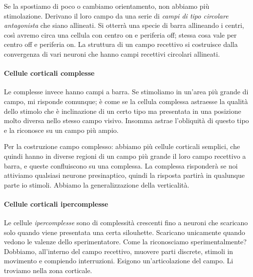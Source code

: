\documentclass[a4paper,12pt]{article}
\begin{document}
Se la spostiamo di poco o cambiamo orientamento, non abbiamo più stimolazione. Derivano il loro campo da una serie di \emph{campi di tipo circolare antagonista} che siano allineati. Si otterrà una specie di barra allineando i centri, così avremo circa una cellula con centro on e periferia off; stessa cosa vale per centro off e periferia on. La struttura di un campo recettivo si costruisce dalla convergenza di vari neuroni che hanno campi recettivi circolari allineati. 

\paragraph{Cellule corticali complesse}
Le complesse invece hanno campi a barra. Se stimoliamo in un'area più grande di campo, mi risponde comunque; è come se la cellula complessa astraesse la qualità dello stimolo che è inclinazione di un certo tipo ma presentata in una posizione molto diversa nello stesso campo visivo. Insomma astrae l'obliquità di questo tipo e la riconosce su un campo più ampio. 

Per la costruzione campo complesso: abbiamo più cellule corticali semplici, che quindi hanno in diverse regioni di un campo più grande il loro campo recettivo a barra, e queste confluiscono su una complessa. La complessa risponderà se noi attiviamo qualsiasi neurone presinaptico, quindi la risposta partirà in qualunque parte io stimoli. Abbiamo la generalizzazione della verticalità. 

\paragraph{Cellule corticali ipercomplesse}
Le cellule \emph{ipercomplesse} sono di complessità crescenti fino a neuroni che scaricano solo quando viene presentata una certa silouhette. Scaricano unicamente quando vedono le valenze dello sperimentatore. Come la riconosciamo sperimentalmente? Dobbiamo, all'interno del campo recettivo, muovere parti discrete, stimoli in movimento e compiendo interruzioni. Esigono un'articolazione del campo. Li troviamo nella zona corticale.
\end{document}

